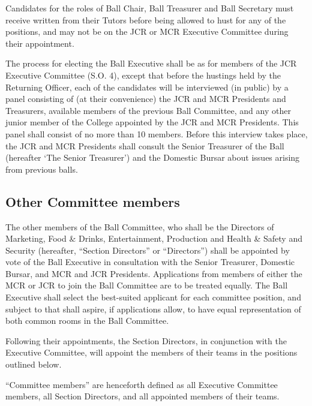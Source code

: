 \appnpara Candidates for the roles of Ball Chair, Ball Treasurer and Ball Secretary must receive written from their Tutors before being allowed to hust for any of the positions, and may not be on the JCR or MCR Executive Committee during their appointment.

\appnpara The process for electing the Ball Executive shall be as for members of the JCR Executive Committee (S.O. 4), except that before the hustings held by the Returning Officer, each of the candidates will be interviewed (in public) by a panel consisting of (at their convenience) the JCR and MCR Presidents and Treasurers, available members of the previous Ball Committee, and any other junior member of the College appointed by the JCR and MCR Presidents.  This panel shall consist of no more than 10 members.  Before this interview takes place, the JCR and MCR Presidents shall consult the Senior Treasurer of the Ball (hereafter ‘The Senior Treasurer’) and the Domestic Bursar about issues arising from previous balls.  

\subsection{Other Committee members}

\appnpara The other members of the Ball Committee, who shall be the Directors of Marketing, Food \& Drinks, Entertainment, Production and Health \& Safety and Security (hereafter, ``Section Directors'' or ``Directors'') shall be appointed by vote of the Ball Executive in consultation with the Senior Treasurer, Domestic Bursar, and MCR and JCR Presidents.  Applications from members of either the MCR or JCR to join the Ball Committee are to be treated equally.  The Ball Executive shall select the best-suited applicant for each committee position, and subject to that shall aspire, if applications allow, to have equal representation of both common rooms in the Ball Committee.

\appnpara Following their appointments, the Section Directors, in conjunction with the Executive Committee, will appoint the members of their teams in the positions outlined below. 

\appnpara ``Committee members'' are henceforth defined as all Executive Committee members, all Section Directors, and all appointed members of their teams.

